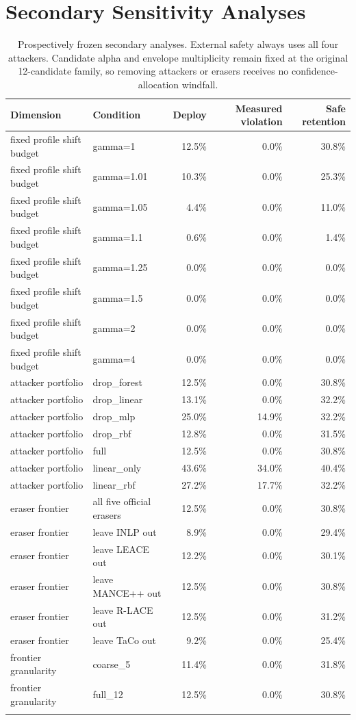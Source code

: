 \section{Secondary Sensitivity Analyses}
\begin{table}[!htbp]
\centering\scriptsize
\begin{tabular}{llrrr}
\toprule
Dimension & Condition & Deploy & Measured violation & Safe retention \\
\midrule
fixed profile shift budget & gamma=1 & 12.5\% & 0.0\% & 30.8\% \\
fixed profile shift budget & gamma=1.01 & 10.3\% & 0.0\% & 25.3\% \\
fixed profile shift budget & gamma=1.05 & 4.4\% & 0.0\% & 11.0\% \\
fixed profile shift budget & gamma=1.1 & 0.6\% & 0.0\% & 1.4\% \\
fixed profile shift budget & gamma=1.25 & 0.0\% & 0.0\% & 0.0\% \\
fixed profile shift budget & gamma=1.5 & 0.0\% & 0.0\% & 0.0\% \\
fixed profile shift budget & gamma=2 & 0.0\% & 0.0\% & 0.0\% \\
fixed profile shift budget & gamma=4 & 0.0\% & 0.0\% & 0.0\% \\
\addlinespace
attacker portfolio & drop\_forest & 12.5\% & 0.0\% & 30.8\% \\
attacker portfolio & drop\_linear & 13.1\% & 0.0\% & 32.2\% \\
attacker portfolio & drop\_mlp & 25.0\% & 14.9\% & 32.2\% \\
attacker portfolio & drop\_rbf & 12.8\% & 0.0\% & 31.5\% \\
attacker portfolio & full & 12.5\% & 0.0\% & 30.8\% \\
attacker portfolio & linear\_only & 43.6\% & 34.0\% & 40.4\% \\
attacker portfolio & linear\_rbf & 27.2\% & 17.7\% & 32.2\% \\
\addlinespace
eraser frontier & all five official erasers & 12.5\% & 0.0\% & 30.8\% \\
eraser frontier & leave INLP out & 8.9\% & 0.0\% & 29.4\% \\
eraser frontier & leave LEACE out & 12.2\% & 0.0\% & 30.1\% \\
eraser frontier & leave MANCE++ out & 12.5\% & 0.0\% & 30.8\% \\
eraser frontier & leave R-LACE out & 12.5\% & 0.0\% & 31.2\% \\
eraser frontier & leave TaCo out & 9.2\% & 0.0\% & 25.4\% \\
\addlinespace
frontier granularity & coarse\_5 & 11.4\% & 0.0\% & 31.8\% \\
frontier granularity & full\_12 & 12.5\% & 0.0\% & 30.8\% \\
\addlinespace
\bottomrule
\end{tabular}
\caption{Prospectively frozen secondary analyses. External safety always uses all four attackers. Candidate alpha and envelope multiplicity remain fixed at the original 12-candidate family, so removing attackers or erasers receives no confidence-allocation windfall.}
\label{tab:ablations}
\end{table}
